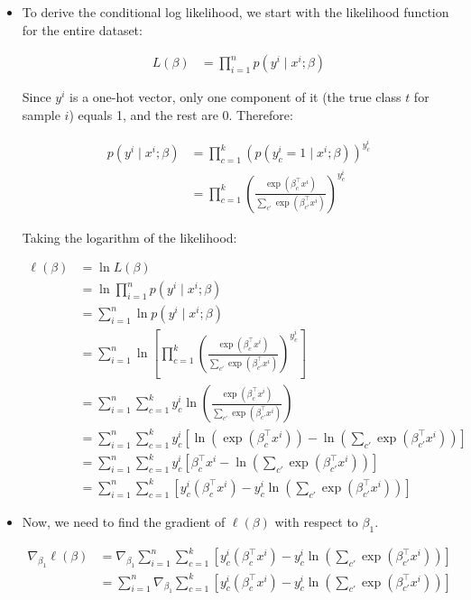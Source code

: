 \begin{itemize}
\item[(a)] To derive the conditional log likelihood, we start with the likelihood function for the entire dataset:

\begin{align*}
L(\beta) &= \prod_{i=1}^{n} p(y^i \mid x^i; \beta)
\end{align*}

Since $y^i$ is a one-hot vector, only one component of it (the true class $t$ for sample $i$) equals 1, and the rest are 0. Therefore:

\begin{align*}
p(y^i \mid x^i; \beta) &= \prod_{c=1}^{k} \left(p(y_c^i=1 \mid x^i; \beta)\right)^{y_c^i} \\
&= \prod_{c=1}^{k} \left(\frac{\exp(\beta_c^\top x^i)}{\sum_{c'}\exp(\beta_{c'}^\top x^i)}\right)^{y_c^i}
\end{align*}

Taking the logarithm of the likelihood:

\begin{align*}
\ell(\beta) &= \ln L(\beta) \\
&= \ln \prod_{i=1}^{n} p(y^i \mid x^i; \beta) \\
&= \sum_{i=1}^{n} \ln p(y^i \mid x^i; \beta) \\
&= \sum_{i=1}^{n} \ln \left[ \prod_{c=1}^{k} \left(\frac{\exp(\beta_c^\top x^i)}{\sum_{c'}\exp(\beta_{c'}^\top x^i)}\right)^{y_c^i} \right] \\
&= \sum_{i=1}^{n} \sum_{c=1}^{k} y_c^i \ln \left(\frac{\exp(\beta_c^\top x^i)}{\sum_{c'}\exp(\beta_{c'}^\top x^i)}\right) \\
&= \sum_{i=1}^{n} \sum_{c=1}^{k} y_c^i \left[ \ln(\exp(\beta_c^\top x^i)) - \ln\left(\sum_{c'}\exp(\beta_{c'}^\top x^i)\right) \right] \\
&= \sum_{i=1}^{n} \sum_{c=1}^{k} y_c^i \left[ \beta_c^\top x^i - \ln\left(\sum_{c'}\exp(\beta_{c'}^\top x^i)\right) \right] \\
&= \sum_{i=1}^{n} \sum_{c=1}^{k} \left[ y_c^i(\beta_c^\top x^i) - y_c^i\ln\left(\sum_{c'}\exp(\beta_{c'}^\top x^i)\right) \right]
\end{align*}

\item[(b)] Now, we need to find the gradient of $\ell(\beta)$ with respect to $\beta_1$.

\begin{align*}
\nabla_{\beta_1}\ell(\beta) &= \nabla_{\beta_1} \sum_{i=1}^{n}\sum_{c=1}^{k}\left[ y_c^i(\beta_c^\top x^i) - y_c^i\ln \left(\sum_{c'}\exp(\beta_{c'}^\top x^i) \right)\right] \\
&= \sum_{i=1}^{n}\nabla_{\beta_1}\sum_{c=1}^{k}\left[ y_c^i(\beta_c^\top x^i) - y_c^i\ln \left(\sum_{c'}\exp(\beta_{c'}^\top x^i) \right)\right]
\end{align*}


\end{itemize}
